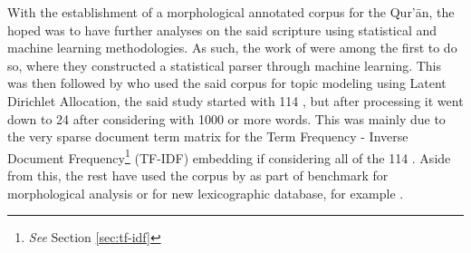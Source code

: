 With the establishment of a morphological annotated corpus for the Qur'\=an, the hoped was to have further analyses on the said scripture using statistical and machine learning methodologies. As such, the work of  were among the first to do so, where they constructed a statistical parser through machine learning. This was then followed by  who used the said corpus for topic modeling using Latent Dirichlet Allocation, the said study started with 114  , but after processing it went down to 24   after considering   with 1000 or more words. This was mainly due to the very sparse document term matrix for the Term Frequency - Inverse Document Frequency\footnote{\textit{See} Section \ref{sec:tf-idf}} (TF-IDF) embedding if considering all of the 114  . Aside from this, the rest have used the corpus by  as part of benchmark for morphological analysis or for new lexicographic database, for example .

